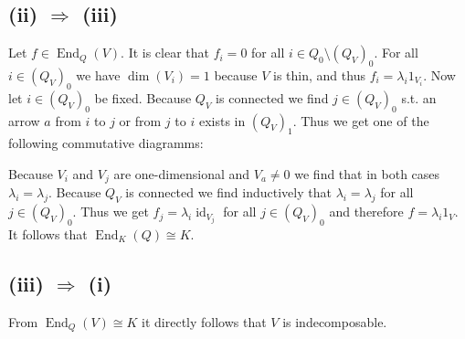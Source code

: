 \documentclass[a4paper,10pt]{article}
\theoremstyle{definition}
\newcommand{\End}{\operatorname{End}}
\newcommand{\id}{\operatorname{id}}
\begin{document}
\subsection*{(ii) $\Rightarrow$ (iii)}
Let $f \in \End_Q(V)$. It is clear that $f_i = 0$ for all $i \in Q_0 \setminus (Q_V)_0$. For all $i \in (Q_V)_0$ we have $\dim(V_i) = 1$ because $V$ is thin, and thus $f_i = \lambda_i 1_{V_i}$. Now let $i \in (Q_V)_0$ be fixed. Because $Q_V$ is connected we find $j \in (Q_V)_0$ s.t. an arrow $a$ from $i$ to $j$ or from $j$ to $i$ exists in $(Q_V)_1$. Thus we get one of the following commutative diagramms:
\begin{center}
\begin{minipage}{.3\textwidth}
\end{minipage}%
\begin{minipage}{.3\textwidth}
\end{minipage}%
\end{center}
Because $V_i$ and $V_j$ are one-dimensional and $V_a \neq 0$ we find that in both cases $\lambda_i = \lambda_j$. Because $Q_V$ is connected we find inductively that $\lambda_i = \lambda_j$ for all $j \in (Q_V)_0$. Thus we get $f_j = \lambda_i \id_{V_j}$ for all $j \in (Q_V)_0$ and therefore $f = \lambda_i 1_V$. It follows that $\End_K(Q) \cong K$.


\subsection*{(iii) $\Rightarrow$ (i)}
From $\End_Q(V) \cong K$ it directly follows that $V$ is indecomposable.
\end{document}
